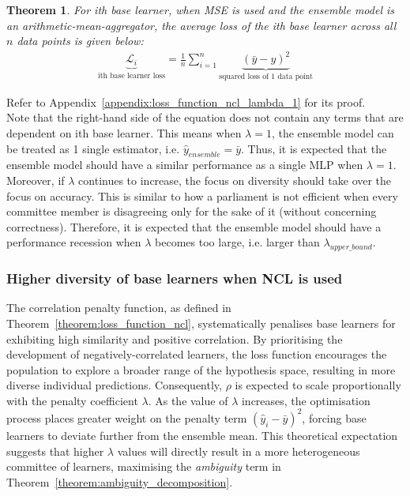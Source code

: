 \documentclass{article}
\newtheorem{theorem}{Theorem}
\begin{document}
\begin{theorem}\label{theorem:loss_function_ncl_lambda_1}
    For ith base learner, when MSE is used and the ensemble model is an arithmetic-mean-aggregator, the average loss of the ith base learner across all $n$ data points is given below: 
    \begin{align*}
        \underbrace{\mathcal{L}_i}_{\text{ith base learner loss}} = \frac{1}{n} \sum^{n}_{i = 1} \underbrace{(\bar{y} - y)^2}_{\text{squared loss of 1 data point}}
    \end{align*}
\end{theorem}
Refer to Appendix~\ref{appendix:loss_function_ncl_lambda_1} for its proof. 
\\
Note that the right-hand side of the equation does not contain any terms that are dependent on ith base learner. This means when $\lambda = 1$, the ensemble model can be treated as 1 single estimator, i.e. $\hat{y}_{ensemble} = \bar{y}$. Thus, it is expected that the ensemble model should have a similar performance as a single MLP when $\lambda = 1$. Moreover, if $\lambda$ continues to increase, the focus on diversity should take over the focus on accuracy. This is similar to how a parliament is not efficient when every committee member is disagreeing only for the sake of it (without concerning correctness). Therefore, it is expected that the ensemble model should have a performance recession when $\lambda$ becomes too large, i.e. larger than $\lambda_{upper\_bound}$. 


\subsubsection{Higher diversity of base learners when NCL is used}
The correlation penalty function, as defined in Theorem~\ref{theorem:loss_function_ncl}, systematically penalises base learners for exhibiting high similarity and positive correlation. By prioritising the development of negatively-correlated learners, the loss function encourages the population to explore a broader range of the hypothesis space, resulting in more diverse individual predictions. Consequently, $\rho$ is expected to scale proportionally with the penalty coefficient $\lambda$. As the value of $\lambda$ increases, the optimisation process places greater weight on the penalty term $(\hat{y}_i - \bar{y})^2$, forcing base learners to deviate further from the ensemble mean. This theoretical expectation suggests that higher $\lambda$ values will directly result in a more heterogeneous committee of learners, maximising the \textit{ambiguity} term in Theorem~\ref{theorem:ambiguity_decomposition}. 
\end{document}
